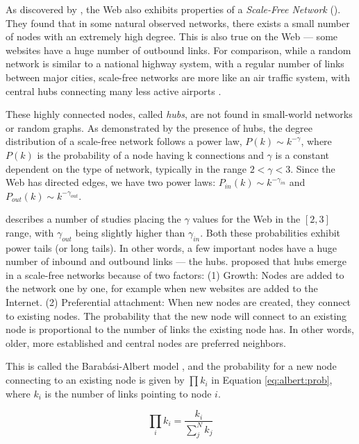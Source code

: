 As discovered by \cite{Albert1999}, the Web also exhibits properties of a \emph{Scale-Free Network} (). 
They found that in some natural observed networks, there exists a small number of nodes with an extremely high degree. 
This is also true on the Web --- some websites have a huge number of outbound links. 
For comparison, while a random network is similar to a national highway system, with a regular number of links between major cities, scale-free networks are more like an air traffic system, with central hubs connecting many less active airports \citep[p71]{Barabasi2003}.

These highly connected nodes, called \emph{hubs}, are not found in small-world networks or random graphs. As demonstrated by the presence of hubs, the degree distribution of a scale-free network follows a power law, 
$P(k) \sim k^{-\gamma}$, 
where $P(k)$ is the probability of a node having k connections and $\gamma$ is a constant dependent on the type of network, typically in the range $2 < \gamma < 3$. 
Since the Web has directed edges,
we have two power laws:
$P_{in}(k) \sim k^{-\gamma_{in}}$ and 
$P_{out}(k) \sim k^{-\gamma_{out}}$.

\cite{Albert1999} describes a number of studies placing the $\gamma$ values for the Web in the $[2,3]$ range, 
with $\gamma_{out}$ being slightly higher than $\gamma_{in}$. 
Both these probabilities exhibit power tails (or long tails). 
In other words, a few important nodes have a huge number of inbound and outbound links --- the hubs. 
\citet[p86]{Barabasi2003} proposed that hubs emerge in a scale-free networks because of two factors:
(1) Growth: Nodes are added to the network one by one, for example when new websites are added to the Internet.
(2) Preferential attachment: When new nodes are created, they connect to existing nodes. The probability that the new node will connect to an existing node is proportional to the number of links the existing node has. In other words, older, more established and central nodes are preferred neighbors.

This is called the Barab\'{a}si-Albert model \citep{Albert1999}, 
and the probability for a new node connecting to an existing node is given by $\prod k_i$ in Equation \ref{eq:albert:prob}, 
where $k_i$ is the number of links pointing to node $i$. 

\begin{equation}\label{eq:albert:prob}
  \prod_{i} k_i  = \frac{k_i}{\sum_{j}^N k_j}
\end{equation} 

